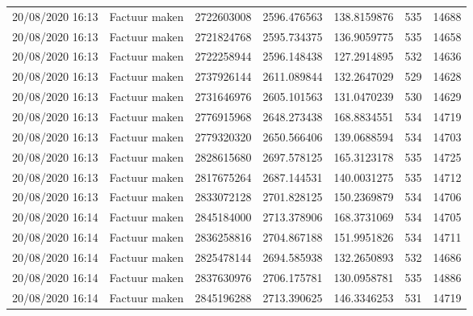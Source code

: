 \begin{tiny}
\begin{longtable}{lllllll}
    20/08/2020 16:13 & Factuur maken         & 2722603008        & 2596.476563 & 138.8159876           & 535              & 14688            \\
    20/08/2020 16:13 & Factuur maken         & 2721824768        & 2595.734375 & 136.9059775           & 535              & 14658            \\
    20/08/2020 16:13 & Factuur maken         & 2722258944        & 2596.148438 & 127.2914895           & 532              & 14636            \\
    20/08/2020 16:13 & Factuur maken         & 2737926144        & 2611.089844 & 132.2647029           & 529              & 14628            \\
    20/08/2020 16:13 & Factuur maken         & 2731646976        & 2605.101563 & 131.0470239           & 530              & 14629            \\
    20/08/2020 16:13 & Factuur maken         & 2776915968        & 2648.273438 & 168.8834551           & 534              & 14719            \\
    20/08/2020 16:13 & Factuur maken         & 2779320320        & 2650.566406 & 139.0688594           & 534              & 14703            \\
    20/08/2020 16:13 & Factuur maken         & 2828615680        & 2697.578125 & 165.3123178           & 535              & 14725            \\
    20/08/2020 16:13 & Factuur maken         & 2817675264        & 2687.144531 & 140.0031275           & 535              & 14712            \\
    20/08/2020 16:13 & Factuur maken         & 2833072128        & 2701.828125 & 150.2369879           & 534              & 14706            \\
    20/08/2020 16:14 & Factuur maken         & 2845184000        & 2713.378906 & 168.3731069           & 534              & 14705            \\
    20/08/2020 16:14 & Factuur maken         & 2836258816        & 2704.867188 & 151.9951826           & 534              & 14711            \\
    20/08/2020 16:14 & Factuur maken         & 2825478144        & 2694.585938 & 132.2650893           & 532              & 14686            \\
    20/08/2020 16:14 & Factuur maken         & 2837630976        & 2706.175781 & 130.0958781           & 535              & 14886            \\
    20/08/2020 16:14 & Factuur maken         & 2845196288        & 2713.390625 & 146.3346253           & 531              & 14719            \\

\end{longtable}
\end{tiny}
